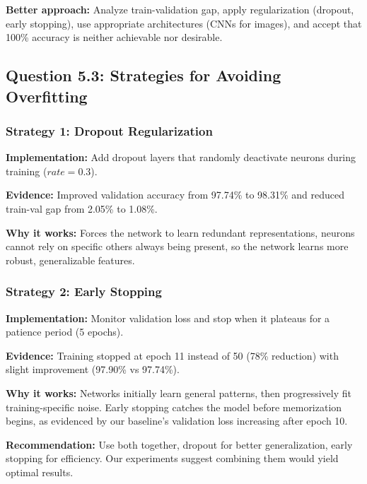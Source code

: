 \textbf{Better approach:} Analyze train-validation gap, apply regularization (dropout, early stopping), use appropriate architectures (CNNs for images), and accept that 100\% accuracy is neither achievable nor desirable.

\subsection{Question 5.3: Strategies for Avoiding Overfitting}

\subsubsection{Strategy 1: Dropout Regularization}

\textbf{Implementation:} Add dropout layers that randomly deactivate neurons during training ($rate=0.3$).

\textbf{Evidence:} Improved validation accuracy from 97.74\% to 98.31\% and reduced train-val gap from 2.05\% to 1.08\%.

\textbf{Why it works:} Forces the network to learn redundant representations, neurons cannot rely on specific others always being present, so the network learns more robust, generalizable features.

\subsubsection{Strategy 2: Early Stopping}

\textbf{Implementation:} Monitor validation loss and stop when it plateaus for a patience period (5 epochs).

\textbf{Evidence:} Training stopped at epoch 11 instead of 50 (78\% reduction) with slight improvement (97.90\% vs 97.74\%).

\textbf{Why it works:} Networks initially learn general patterns, then progressively fit training-specific noise. Early stopping catches the model before memorization begins, as evidenced by our baseline's validation loss increasing after epoch 10.

\textbf{Recommendation:} Use both together, dropout for better generalization, early stopping for efficiency. Our experiments suggest combining them would yield optimal results.